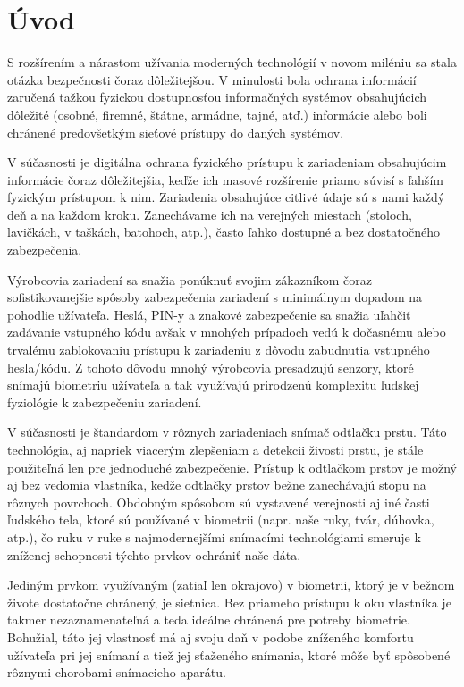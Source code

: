 
\chapter{Úvod}
S rozšírením a nárastom užívania moderných technológií v novom miléniu sa stala otázka bezpečnosti čoraz dôležitejšou. V minulosti bola ochrana informácií zaručená tažkou fyzickou dostupnosťou informačných systémov obsahujúcich dôležité (osobné, firemné, štátne, armádne, tajné, atď.) informácie alebo boli chránené predovšetkým sieťové prístupy do daných systémov.

V súčasnosti je digitálna ochrana fyzického prístupu k zariadeniam obsahujúcim informácie čoraz dôležitejšia, keďže ich masové rozšírenie priamo súvisí s ľahším fyzickým prístupom k nim. Zariadenia obsahujúce citlivé údaje sú s nami každý deň a na každom kroku. Zanechávame ich na verejných miestach (stoloch, lavičkách, v taškách, batohoch, atp.), často ľahko dostupné a bez dostatočného zabezpečenia.

Výrobcovia zariadení sa snažia ponúknuť svojim zákazníkom čoraz sofistikovanejšie spôsoby zabezpečenia zariadení s minimálnym dopadom na pohodlie užívateľa. Heslá, PIN-y a znakové zabezpečenie sa snažia uľahčiť zadávanie vstupného kódu avšak v mnohých prípadoch vedú k dočasnému alebo trvalému zablokovaniu prístupu k zariadeniu z dôvodu zabudnutia vstupného hesla/kódu. Z tohoto dôvodu mnohý výrobcovia presadzujú senzory, ktoré snímajú biometriu užívateľa a tak využívajú prirodzenú komplexitu ľudskej fyziológie k zabezpečeniu zariadení.

V súčasnosti je štandardom v rôznych zariadeniach snímač odtlačku prstu. Táto technológia, aj napriek viacerým zlepšeniam a detekcii živosti prstu, je stále použiteľná len pre jednoduché zabezpečenie. Prístup k odtlačkom prstov je možný aj bez vedomia vlastníka, kedže odtlačky prstov bežne zanechávajú stopu na rôznych povrchoch. Obdobným spôsobom sú vystavené verejnosti aj iné časti ľudského tela, ktoré sú používané v biometrii (napr. naše ruky, tvár, dúhovka, atp.), čo ruku v ruke s najmodernejšími snímacími technológiami smeruje k zníženej schopnosti týchto prvkov ochrániť naše dáta.

Jediným prvkom využívaným (zatiaľ len okrajovo) v biometrii, ktorý je v bežnom živote dostatočne chránený, je sietnica. Bez priameho prístupu k oku vlastníka je takmer nezaznamenateľná a teda ideálne chránená pre potreby biometrie. Bohužial, táto jej vlastnosť má aj svoju daň v podobe zníženého komfortu užívateľa pri jej snímaní a tiež jej sťaženého snímania, ktoré môže byť spôsobené rôznymi chorobami snímacieho aparátu.

